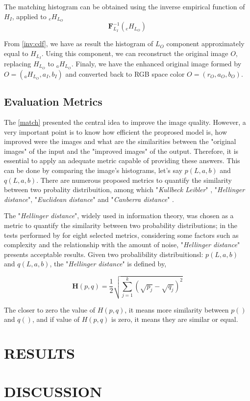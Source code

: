 \documentclass{article}
\begin{document}
The matching histogram can be obtained using the inverse empirical function of $H_I$, applied to $_eH_{L_O}$
\begin{equation}
    \bm F^{-1}_{L_I}(_eH_{L_O})
    \label{inv:cdf}
\end{equation}

From \ref{inv:cdf}, we have as result the histogram of $L_O$ component approximately equal to $H_{L_I}$. Using this component, we can reconstruct the original image $O$, replacing $H_{L_O}$ to $_aH_{L_O}$. Finaly, we have the enhanced original image formed by $O = (_aH_{L_O}, a_I, b_I)$ and converted back to RGB space color $O = (r_O, a_O, b_O)$.

\subsection{Evaluation Metrics}

The \ref{match} presented the central idea to improve the image quality. However, a very important point is to know how efficient the proprosed model is, how improved were the images and what are the similarities between the "original images" of the input and the "improved images" of the output. Therefore, it is essential to apply an adequate metric capable of providing these answers. This can be done by comparing the image's histograms, let's say $p(L, a, b)$ and $q(L, a, b)$. There are numerous proposed metrics to quantify the similarity between two probality distribuition, among which "\textit{Kullbeck Leibler}" \citep{AssessingInformationContentinColorImages}, "\textit{Hellinger distance}", "\textit{Euclidean distance}" and "\textit{Canberra distance}" \citep{BanchmarckSimiliraty}. 

The "\textit{Hellinger distance}", widely used in information theory, was chosen as a metric to quantify the similarity between two probability distributions; in the tests performed by \citep{BanchmarckSimiliraty} for eight selected metrics, considering some factors such as complexity and the relationship with the amount of noise, "\textit{Hellinger distance}" presents acceptable results. Given two probalibility distribuitionsl: $p(L, a, b)$ and $q(L, a, b)$, the "\textit{Hellinger distance}" is defined by,

\begin{equation}
    \bm H(p, q) = \frac{1}{2}\sqrt{\sum_{j=1}^k (\sqrt{p_j} - \sqrt{q_j})^2}
\end{equation}

The closer to zero the value of $H(p, q)$, it means more similarity between $p()$ and $q()$, and if value of $H(p, q)$ is zero, it means they are similar or equal.











\section{RESULTS}
\label{sec:pagestyle}


\section{DISCUSSION}
\label{sec:typestyle}




\end{document}
